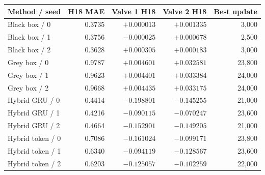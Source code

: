 \begin{tabular}{lrrrr}
\toprule
Method / seed & H18 MAE & Valve 1 H18 & Valve 2 H18 & Best update\\
\midrule
Black box / 0 & 0.3735 & $+0.000013$ & $+0.001335$ & 3,000 \\
Black box / 1 & 0.3756 & $-0.000025$ & $+0.000678$ & 2,500 \\
Black box / 2 & 0.3628 & $+0.000305$ & $+0.000183$ & 3,000 \\
Grey box / 0 & 0.9787 & $+0.004601$ & $+0.032581$ & 23,800 \\
Grey box / 1 & 0.9623 & $+0.004401$ & $+0.033384$ & 24,000 \\
Grey box / 2 & 0.9668 & $+0.004435$ & $+0.033175$ & 24,000 \\
Hybrid GRU / 0 & 0.4414 & $-0.198801$ & $-0.145255$ & 21,000 \\
Hybrid GRU / 1 & 0.4216 & $-0.090115$ & $-0.070247$ & 23,600 \\
Hybrid GRU / 2 & 0.4664 & $-0.152901$ & $-0.149205$ & 21,000 \\
Hybrid token / 0 & 0.7086 & $-0.161024$ & $-0.099171$ & 23,800 \\
Hybrid token / 1 & 0.6340 & $-0.094119$ & $-0.128567$ & 23,600 \\
Hybrid token / 2 & 0.6203 & $-0.125057$ & $-0.102259$ & 22,000 \\
\bottomrule
\end{tabular}
